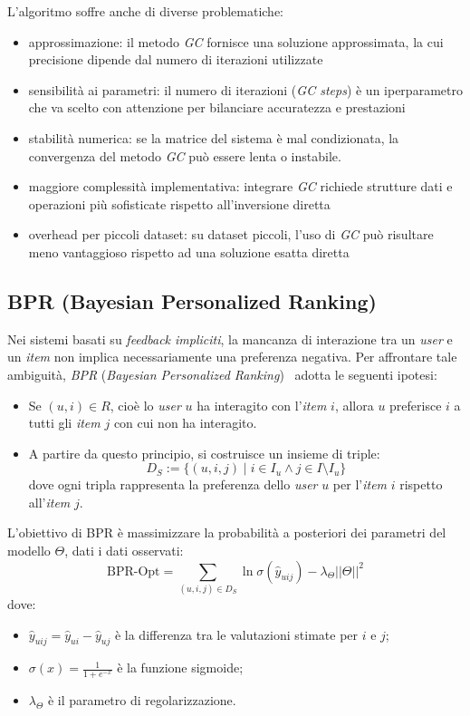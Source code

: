 L'algoritmo soffre anche di diverse problematiche:

\begin{itemize}
    \item approssimazione: il metodo \textit{GC} fornisce una soluzione approssimata, la cui precisione dipende dal numero di iterazioni utilizzate
    \item sensibilità ai parametri: il numero di iterazioni (\textit{GC steps}) è un iperparametro che va scelto con attenzione per bilanciare accuratezza e prestazioni
    \item stabilità numerica: se la matrice del sistema è mal condizionata, la convergenza del metodo \textit{GC} può essere lenta o instabile.
    \item maggiore complessità implementativa: integrare \textit{GC} richiede strutture dati e operazioni più sofisticate rispetto all'inversione diretta
    \item overhead per piccoli dataset: su dataset piccoli, l'uso di \textit{GC} può risultare meno vantaggioso rispetto ad una soluzione esatta diretta
\end{itemize}

\subsection{BPR (Bayesian Personalized Ranking)}\label{bpr}

Nei sistemi basati su \textit{feedback impliciti}, la mancanza di interazione tra un \textit{user} e un \textit{item} non implica necessariamente una preferenza negativa. Per affrontare tale ambiguità, \textit{BPR} (\textit{Bayesian Personalized Ranking})~\cite{BPR} adotta le seguenti ipotesi:

\begin{itemize}
    \item Se $(u, i) \in R$, cioè lo \textit{user} $u$ ha interagito con l'\textit{item} $i$, allora $u$ preferisce $i$ a tutti gli \textit{item} $j$ con cui non ha interagito.
    \item A partire da questo principio, si costruisce un insieme di triple:
    \[
    D_S := \{(u, i, j) \mid i \in I_u \wedge j \in I \setminus I_u\}
    \]
    dove ogni tripla rappresenta la preferenza dello \textit{user} $u$ per l'\textit{item} $i$ rispetto all'\textit{item} $j$.
\end{itemize}

L'obiettivo di BPR è massimizzare la probabilità a posteriori dei parametri del modello $\Theta$, dati i dati osservati:
\[
\text{BPR-Opt} = \sum_{(u, i, j) \in D_S} \ln \sigma(\hat{y}_{uij}) - \lambda_\Theta ||\Theta||^2
\]
dove:
\begin{itemize}
    \item $\hat{y}_{uij} = \hat{y}_{ui} - \hat{y}_{uj}$ è la differenza tra le valutazioni stimate per $i$ e $j$;
    \item $\sigma(x) = \frac{1}{1 + e^{-x}}$ è la funzione sigmoide;
    \item $\lambda_\Theta$ è il parametro di regolarizzazione.
\end{itemize}

